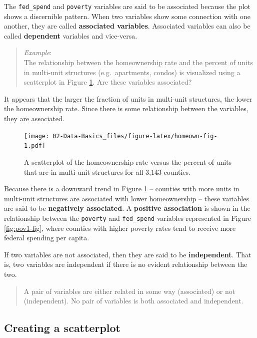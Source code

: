 \documentclass[
]{book}
\begin{document}
The \texttt{fed\_spend} and \texttt{poverty} variables are said to be associated because the plot shows a discernible pattern. When two variables show some connection with one another, they are called \textbf{associated variables}. Associated variables can also be called \textbf{dependent} variables and vice-versa.

\begin{quote}
\emph{Example}:\\
The relationship between the homeownership rate and the percent of units in multi-unit structures (e.g.~apartments, condos) is visualized using a scatterplot in Figure \ref{fig:homeown-fig}. Are these variables associated?
\end{quote}

It appears that the larger the fraction of units in multi-unit structures, the lower the homeownership rate. Since there is some relationship between the variables, they are associated.

\begin{figure}
\centering
\texttt{[image: 02-Data-Basics\_files/figure-latex/homeown-fig-1.pdf]}
\caption{\label{fig:homeown-fig}A scatterplot of the homeownership rate versus the percent of units that are in multi-unit structures for all 3,143 counties.}
\end{figure}

Because there is a downward trend in Figure \ref{fig:homeown-fig} -- counties with more units in multi-unit structures are associated with lower homeownership -- these variables are said to be \textbf{negatively associated}. A \textbf{positive association} is shown in the relationship between the \texttt{poverty} and \texttt{fed\_spend} variables represented in Figure \ref{fig:pov1-fig}, where counties with higher poverty rates tend to receive more federal spending per capita.

If two variables are not associated, then they are said to be \textbf{independent}. That is, two variables are independent if there is no evident relationship between the two.

\begin{quote}
A pair of variables are either related in some way (associated) or not (independent). No pair of variables is both associated and independent.
\end{quote}

\hypertarget{creating-a-scatterplot}{%
\subsection{Creating a scatterplot}\label{creating-a-scatterplot}}
\end{document}
